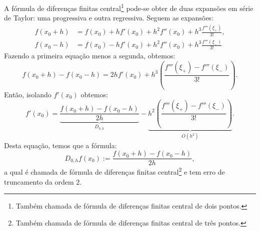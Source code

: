 A fórmula de diferenças finitas central\footnote{Também chamada de fórmula de diferenças finitas central de dois pontos.} pode-se obter de duas expansões em série de Taylor: uma progressiva e outra regressiva. Seguem as expansões:
\begin{equation*}
  \begin{split}
    f(x_0+h) &= f(x_0) + hf'(x_0) + h^2f''(x_0) + h^3\frac{f'''(\xi_{+})}{3!},\\
    f(x_0-h) &= f(x_0) - hf'(x_0) + h^2f''(x_0) + h^3\frac{f'''(\xi_{-})}{3!}
  \end{split}
\end{equation*}
Fazendo a primeira equação menos a segunda, obtemos:
\begin{equation*}
  f(x_0+h)-f(x_0-h) = 2hf'(x_0) + h^{3}\left(\frac{f'''(\xi_{+}) - f'''(\xi_{-})}{3!}\right).
\end{equation*}
Então, isolando $f'(x_0)$ obtemos:
\begin{equation*}
  f'(x_0) = \underbrace{\frac{f(x_0+h) - f(x_0-h)}{2h}}_{D_{0,h}} - \underbrace{h^2\left(\frac{f'''(\xi_+) - f'''(\xi_-)}{3!}\right)}_{O(h^2)}.
\end{equation*}
Desta equação, temos que a fórmula:
\begin{equation*}
  D_{0,h}f(x_0) := \frac{f(x_0+h)-f(x_0-h)}{2h},
\end{equation*}
a qual é chamada de fórmula de diferenças finitas central\footnote{Também chamada de fórmula de diferenças finitas central de três pontos.} e tem erro de truncamento da ordem $2$.

